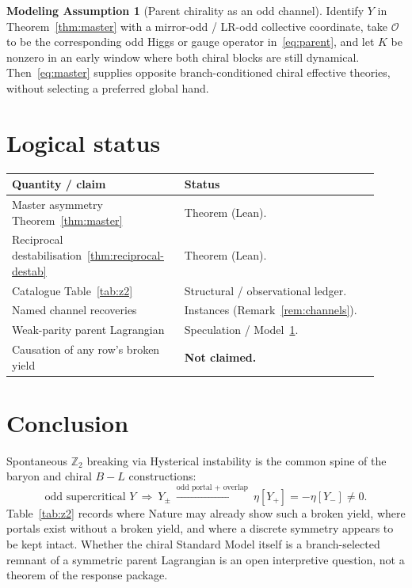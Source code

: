 \documentclass[11pt]{article}
\theoremstyle{definition}
\newtheorem{model}[theorem]{Modeling Assumption}
\theoremstyle{remark}
\begin{document}
\begin{model}[Parent chirality as an odd channel]
\label{model:LR}
Identify $Y$ in Theorem~\ref{thm:master} with a mirror-odd / LR-odd collective
coordinate, take $\mathcal O$ to be the corresponding odd Higgs or gauge
operator in~\eqref{eq:parent}, and let $K$ be nonzero in an early window where
both chiral blocks are still dynamical.
Then~\eqref{eq:master} supplies opposite branch-conditioned chiral effective
theories, without selecting a preferred global hand.
\end{model}

\section{Logical status}
\label{sec:status}
\begin{center}
\small
\begin{tabular}{@{}p{0.42\linewidth}p{0.50\linewidth}@{}}
\toprule
\textbf{Quantity / claim} & \textbf{Status}\\
\midrule
Master asymmetry Theorem~\ref{thm:master} & Theorem (Lean).\\
Reciprocal destabilisation~\ref{thm:reciprocal-destab} & Theorem (Lean).\\
Catalogue Table~\ref{tab:z2} & Structural / observational ledger.\\
Named channel recoveries & Instances (Remark~\ref{rem:channels}).\\
Weak-parity parent Lagrangian & Speculation / Model~\ref{model:LR}.\\
Causation of any row's broken yield & \textbf{Not claimed.}\\
\bottomrule
\end{tabular}
\end{center}

\section{Conclusion}
\label{sec:conclusion}
Spontaneous $\mathbb Z_2$ breaking via Hysterical instability is the common
spine of the baryon and chiral $B\!-\!L$ constructions:
\begin{equation}
\boxed{
\text{odd supercritical }Y
\ \Longrightarrow\
Y_\pm
\ \xrightarrow{\text{odd portal $+$ overlap}}\
\eta[Y_+]=-\eta[Y_-]\neq0.
}
\end{equation}
Table~\ref{tab:z2} records where Nature may already show such a broken yield,
where portals exist without a broken yield, and where a discrete symmetry
appears to be kept intact.
Whether the chiral Standard Model itself is a branch-selected remnant of a
symmetric parent Lagrangian is an open interpretive question, not a theorem of
the response package.



\end{document}
